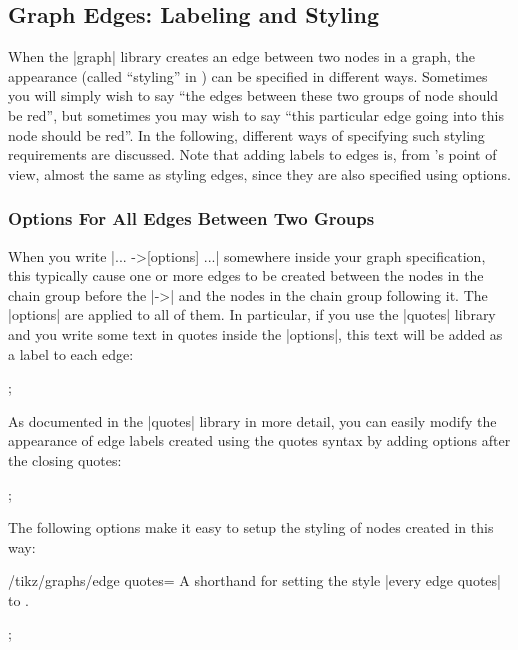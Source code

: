 \subsection{Graph Edges: Labeling and Styling}

When the |graph| library creates an edge between two nodes in a graph, the
appearance (called ``styling'' in \tikzname) can be specified in different
ways. Sometimes you will simply wish to say ``the edges between these two
groups of node should be red'', but sometimes you may wish to say ``this
particular edge going into this node should be red''. In the following,
different ways of specifying such styling requirements are discussed. Note that
adding labels to edges is, from \tikzname's point of view, almost the same as
styling edges, since they are also specified using options.


\subsubsection{Options For All Edges Between Two Groups}

When you write |... ->[options] ...| somewhere inside your graph specification,
this typically cause one or more edges to be created between the nodes in the
chain group before the |->| and the nodes in the chain group following it. The
|options| are applied to all of them. In particular, if you use the |quotes|
library and you write some text in quotes inside the |options|, this text will
be added as a label to each edge:
%
\begin{codeexample}[]
\tikz
  ;
\end{codeexample}

As documented in the |quotes| library in more detail, you can easily modify the
appearance of edge labels created using the quotes syntax by adding options
after the closing quotes:
%
\begin{codeexample}[]
\tikz {};
\end{codeexample}

The following options make it easy to setup the styling of nodes created in
this way:
%
\begin{key}{/tikz/graphs/edge quotes=}
  A shorthand for setting the style |every edge quotes| to .
\begin{codeexample}[]
  \tikz {};
\end{codeexample}
%
\end{key}

